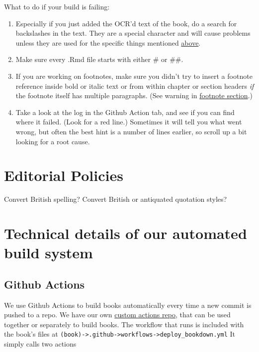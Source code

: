 \documentclass[
]{book}
\providecommand{\tightlist}{%
  \setlength{\itemsep}{0pt}\setlength{\parskip}{0pt}}
\begin{document}
What to do if your build is failing:

\begin{enumerate}
\def\labelenumi{\arabic{enumi}.}
\tightlist
\item
  Especially if you just added the OCR'd text of the book, do a search for backslashes in the text. They are a special character and will cause problems unless they are used for the specific things mentioned \protect\hyperlink{backslashes}{above}.
\item
  Make sure every .Rmd file starts with either \# or \#\#.
\item
  If you are working on footnotes, make sure you didn't try to insert a footnote reference inside bold or italic text or from within chapter or section headers \emph{if} the footnote itself has multiple paragraphs. (See warning in \protect\hyperlink{footnotes}{footnote section}.)
\item
  Take a look at the log in the Github Action tab, and see if you can find where it failed. (Look for a red line.) Sometimes it will tell you what went wrong, but often the best hint is a number of lines earlier, so scroll up a bit looking for a root cause.
\end{enumerate}

\hypertarget{editorial-policies}{%
\chapter{Editorial Policies}\label{editorial-policies}}

Convert British spelling?
Convert British or antiquated quotation styles?

\hypertarget{technical-details-of-our-automated-build-system}{%
\chapter{Technical details of our automated build system}\label{technical-details-of-our-automated-build-system}}

\hypertarget{github-actions}{%
\section{Github Actions}\label{github-actions}}

We use Github Actions to build books automatically every time a new commit is pushed to a repo. We have our own \href{https://github.com/warhornmedia/custom-actions}{custom actions repo}, that can be used together or separately to build books. The workflow that runs is included with the book's files at \texttt{(book)-\textgreater{}.github-\textgreater{}workflows-\textgreater{}deploy\_bookdown.yml} It simply calls two actions
\end{document}
